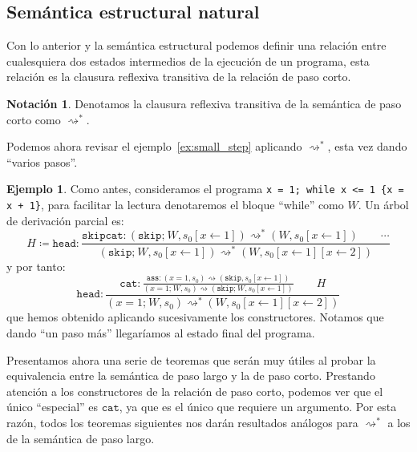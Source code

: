 \documentclass[
  a4paper, 
  10pt, 
  parskip=half, 
  toc=bibliography,
]{scrbook}
\theoremstyle{definition}
\theoremstyle{bolddef}
\newtheorem{notation}[theorem]{Notación}
\newtheorem{example}[theorem]{Ejemplo}
\newcommand{\funfont}[1]{\texttt{#1}}
\newcommand{\ImpConcat}[2]{{#1} \texttt{;} \ {#2}}
\newcommand{\ImpSkip}{\texttt{skip}}
\newcommand{\ImpAssign}[2]{{#1} = {#2}}
\begin{document}
\subsection{Semántica estructural natural}

Con lo anterior y la semántica estructural podemos definir una
relación entre cualesquiera dos estados intermedios de la ejecución de un programa,
esta relación es la clausura reflexiva transitiva de la relación de paso corto.

\begin{notation}
  Denotamos la clausura reflexiva transitiva de la semántica de paso corto como
  \(\rightsquigarrow^*\).
\end{notation}

Podemos ahora revisar el ejemplo~\ref{ex:small_step} aplicando
\(\rightsquigarrow^*\), esta vez dando \enquote{varios pasos}.

\begin{example}
  Como antes, consideramos el programa \texttt{x = 1; while x <= 1 \{x = x + 1\}},
  para facilitar la lectura denotaremos el bloque \enquote{while} como \(W\).
  Un árbol de derivación parcial es:
  \[
    H \coloneqq
    \funfont{head}: \displaystyle{\frac{
        \funfont{skipcat}: (\ImpConcat{\ImpSkip}{W}, s_0[x \leftarrow 1]) \rightsquigarrow^* (W, s_0[x \leftarrow 1])
        \qquad
        \cdots
      }{
        (\ImpConcat{\ImpSkip}{W}, s_0[x \leftarrow 1]) \rightsquigarrow^* (W, s_0[x \leftarrow 1][x \leftarrow 2])
      }}
  \]
  y por tanto:    
  \[
    \funfont{head}: \frac{
      \funfont{cat}: \displaystyle{\frac{
        \funfont{ass}: (\ImpAssign{x}{1}, s_0) \rightsquigarrow (\ImpSkip, s_0[x \leftarrow 1])
      }
      {(\ImpConcat{\ImpAssign{x}{1}}{W}, s_0)
      \rightsquigarrow
      (\ImpConcat{\ImpSkip}{W}, s_0[x \leftarrow 1])
      }}
      \qquad
      H
    }{
      (\ImpConcat{\ImpAssign{x}{1}}{W}, s_0) \rightsquigarrow^* (W, s_0[x \leftarrow 1][x \leftarrow 2])
    }
  \]
  que hemos obtenido aplicando sucesivamente los constructores. Notamos que
  dando \enquote{un paso más} llegaríamos al estado final del programa.
\end{example}

Presentamos ahora una serie de teoremas que serán muy útiles al probar la
equivalencia entre la semántica de paso largo y la de paso corto. Prestando atención
a los constructores de la relación de paso corto, podemos ver que el único
\enquote{especial} es \(\funfont{cat}\), ya que es el único que requiere un argumento.
Por esta razón, todos los teoremas siguientes nos darán resultados análogos para \(\rightsquigarrow^*\)
a los de la semántica de paso largo.
\end{document}
